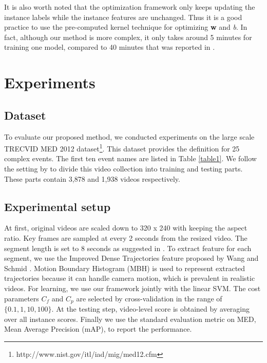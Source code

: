 It is also worth noted that the optimization framework only keeps updating the instance labels while the instance features are unchanged. Thus it is a good practice to use the pre-computed kernel technique for optimizing \textbf{w} and \textit{b}. In fact, although our method is more complex, it only takes around 5 minutes for training one model, compared to 40 minutes that was reported in \cite{lai2014video}. 
\section{Experiments}
\subsection{Dataset} To evaluate our proposed method, we conducted experiments on the large scale TRECVID MED 2012 dataset\footnote{http://www.nist.gov/itl/iad/mig/med12.cfm}. This dataset provides the definition for 25 complex events. The first ten event names are listed in Table \ref{table1}. We follow the setting by \cite{lai2014video} to divide this video collection into training and testing parts. These parts contain 3,878 and 1,938 videos respectively.

\subsection{Experimental setup} At first, original videos are scaled down to 320 x 240 with keeping the aspect ratio. Key frames are sampled at every 2 seconds from the resized video. The segment length is set to 8 seconds as suggested in \cite{vahdat2013compositional}. To extract feature for each segment, we use the Improved Dense Trajectories feature proposed by Wang and Schmid \cite{Wang2013}. Motion Boundary Histogram (MBH) is used to represent extracted trajectories because it can handle camera motion, which is prevalent in realistic videos. For learning, we use our framework jointly with the linear SVM. The cost parameters $C_{f}$ and $C_{p}$ are selected by cross-validation in the range of $\{0.1, 1, 10, 100\}$. At the testing step, video-level score is obtained by averaging over all instance scores. Finally we use the standard evaluation metric on MED, Mean Average Precision (mAP), to report the performance.

